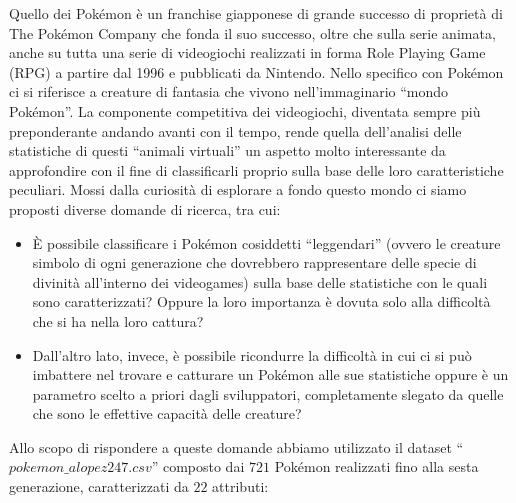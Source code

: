 \documentclass[fleqn,10pt]{SelfArx} %
\begin{document}
Quello dei Pokémon è un franchise giapponese di grande successo di proprietà di The Pokémon Company che fonda il suo successo, oltre che sulla serie animata, anche su tutta una serie di videogiochi realizzati in forma Role Playing Game (RPG) a partire dal 1996 e pubblicati da Nintendo.
Nello specifico con Pokémon ci si riferisce a creature di fantasia che vivono nell'immaginario “mondo Pokémon”.
La componente competitiva dei videogiochi, diventata sempre più preponderante andando avanti con il tempo, rende quella dell'analisi delle statistiche di questi ``animali virtuali” un aspetto molto interessante da approfondire con il fine di classificarli proprio sulla base delle loro caratteristiche peculiari.
Mossi dalla curiosità di esplorare a fondo questo mondo ci siamo proposti diverse domande di ricerca, tra cui: 
\begin{itemize}

\item \`E possibile classificare i Pokémon cosiddetti ``leggendari” (ovvero le creature simbolo di ogni generazione che dovrebbero rappresentare delle specie di divinità all'interno dei videogames) sulla base delle statistiche con le quali sono caratterizzati? Oppure la loro importanza è dovuta solo alla difficoltà che si ha nella loro cattura?
\item Dall'altro lato, invece, è possibile ricondurre la difficoltà in cui ci si può imbattere nel trovare e catturare un Pokémon alle sue statistiche oppure è un parametro scelto a priori dagli sviluppatori, completamente slegato da quelle che sono le effettive capacità delle creature?
\end{itemize}
Allo scopo di rispondere a queste domande abbiamo utilizzato il dataset “$pokemon\_alopez247.csv$”\cite {pokemon} composto dai $721$ Pokémon realizzati fino alla sesta generazione, caratterizzati da $22$ attributi:
\end{document}
